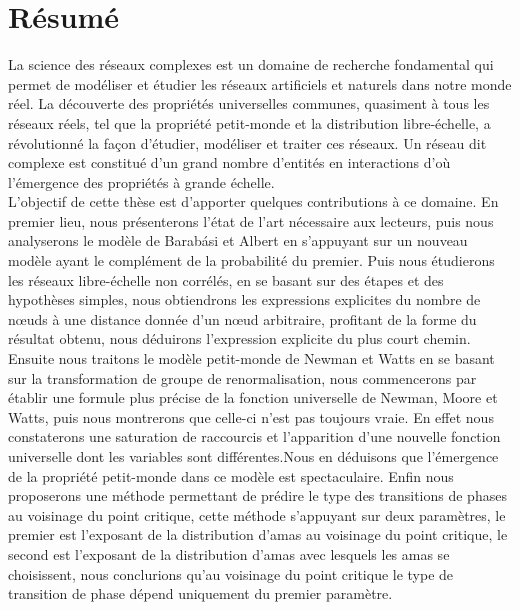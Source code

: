 %
%
\chapter*{Résumé}
 La science des réseaux complexes est un domaine de recherche fondamental qui permet de modéliser et étudier les réseaux artificiels et naturels dans notre monde réel. La découverte
 des propriétés universelles communes, quasiment à tous les réseaux réels, tel que la propriété petit-monde et la distribution libre-échelle, a révolutionné la façon
 d’étudier, modéliser et traiter ces réseaux.
 Un réseau dit complexe est constitué d'un grand nombre d'entités en interactions d’où l’émergence
 des propriétés à grande échelle.\\ L'objectif de cette thèse est d'apporter quelques contributions à ce domaine. En premier lieu, nous présenterons l’état de l’art nécessaire aux lecteurs, puis nous analyserons le modèle de Barabási et Albert en s'appuyant sur un nouveau modèle ayant le complément de la probabilité du premier. Puis nous étudierons les réseaux libre-échelle non corrélés, en se basant sur des étapes et des hypothèses simples, nous obtiendrons les expressions explicites du nombre de nœuds à une distance donnée d'un nœud arbitraire, profitant de la forme du résultat obtenu, nous déduirons l'expression explicite du plus court chemin. Ensuite nous traitons le modèle petit-monde de Newman et Watts en se basant sur la transformation de groupe de renormalisation, nous commencerons par établir une formule plus précise de la fonction universelle de Newman, Moore et Watts, puis nous montrerons que celle-ci n'est pas toujours vraie. En effet nous constaterons une saturation de raccourcis et l'apparition d'une nouvelle fonction universelle dont les variables sont différentes.Nous en déduisons que l'émergence de la propriété petit-monde dans ce modèle est spectaculaire. Enfin nous proposerons une méthode permettant de prédire le type des transitions de phases au voisinage du point critique, cette méthode s'appuyant sur deux paramètres, le premier est l'exposant de la distribution d'amas au voisinage du point critique, le second est l'exposant de la distribution d'amas avec lesquels les amas se choisissent, nous conclurions qu'au voisinage du point critique le type de transition de phase dépend uniquement du premier paramètre. 